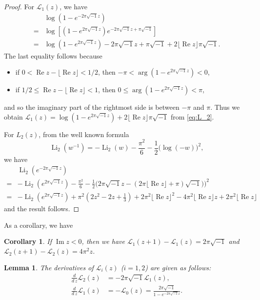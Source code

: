 \documentclass[a4paper,dvipdfmx]{amsart}
\theoremstyle{plain}
\newtheorem{lem}[thm]{Lemma}
\newtheorem{cor}[thm]{Corollary}
\theoremstyle{definition}
\theoremstyle{remark}
\newcommand{\Li}{\operatorname{Li}}
\renewcommand{\L}{\mathcal{L}}
\newcommand{\floor}[1]{\lfloor#1\rfloor}
\renewcommand{\Re}{\operatorname{Re}}
\renewcommand{\Im}{\operatorname{Im}}
\renewcommand{\i}{\sqrt{-1}}
\numberwithin{equation}{section}
\begin{document}
\begin{proof}
For $\L_1(z)$, we have
\begin{align*}
  &\log\left(1-e^{-2\pi\i z}\right)
  \\
  =&
  \log\left[\left(1-e^{2\pi\i z}\right)e^{-2\pi\i z+\pi\i}\right]
  \\
  =&
  \log\left(1-e^{2\pi\i z}\right)
  -2\pi\i z+\pi\i+2\floor{\Re{z}}\pi\i.
\end{align*}
The last equality follows because
\begin{itemize}
\item
if $0<\Re{z}-\floor{\Re{z}}<1/2$, then $-\pi<\arg\left(1-e^{2\pi\i z}\right)<0$,
\item
if $1/2\le\Re{z}-\floor{\Re{z}}<1$, then $0\le\arg\left(1-e^{2\pi\i z}\right)<\pi$,
\end{itemize}
and so the imaginary part of the rightmost side is between $-\pi$ and $\pi$.
Thus we obtain $\L_1(z)=\log\left(1-e^{2\pi\i z}\right)+2\floor{\Re{z}}\pi\i$ from \eqref{eq:L_2}.
\par
For $L_2(z)$, from the well known formula
\begin{equation}\label{eq:dilog_inversion}
  \Li_2(w^{-1})
  =
  -\Li_2(w)
  -\frac{\pi^2}{6}
  -\frac{1}{2}\bigl(\log(-w)\bigr)^2,
\end{equation}
we have
\begin{align*}
  &\Li_2(e^{-2\pi\i z})
  \\
  =&
  -\Li_2(e^{2\pi\i z})
  -\frac{\pi^2}{6}
  -\frac{1}{2}\bigl(2\pi\i z-(2\pi\floor{\Re{z}}+\pi)\i)\bigr)^2
  \\
  =&
  -\Li_2(e^{2\pi\i z})
  +\pi^2\left(2z^2-2z+\frac{1}{3}\right)
  +2\pi^2\floor{\Re{z}}^2-4\pi^2\floor{\Re{z}}z+2\pi^2\floor{\Re{z}}
\end{align*}
and the result follows.
\end{proof}
As a corollary, we have
\begin{cor}\label{cor:L1_L2_Im_negative}
If $\Im{z}<0$, then we have $\L_1(z+1)-\L_1(z)=2\pi\i$ and $\L_2(z+1)-\L_2(z)=4\pi^2z$.
\end{cor}
\begin{lem}\label{lem:der_L1_L2}
The derivatives of $\L_i(z)$ \rm{(}$i=1,2$\rm{)} are given as follows:
\begin{align}
  \frac{d}{d\,z}\L_2(z)
  &=
  -2\pi\i\L_1(z),\label{eq:der_L2}
  \\
  \frac{d}{d\,z}\L_1(z)
  &=
  -\L_0(z)
  =
  \frac{2\pi\i}{1-e^{-2\pi\i z}}.\label{eq:der_L1}
\end{align}
\end{lem}
\end{document}
